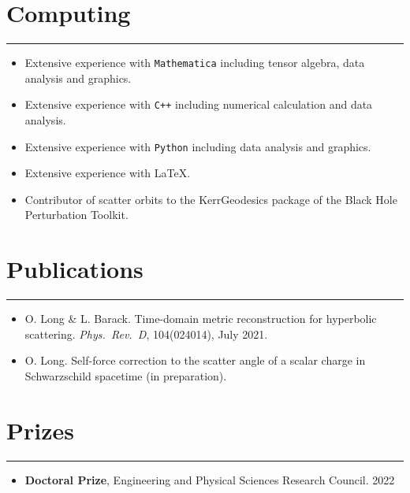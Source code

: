 \documentclass[10.5pt, oneside]{article}   	%
\begin{document}
 {\color{Sectioncolour}
\section*{Computing}
\vspace{-3mm}
\noindent\rule{\linewidth}{0.6pt}}
 \begin{itemize}
\item Extensive experience with \texttt{Mathematica} including tensor algebra, data analysis and graphics. 
\item Extensive experience with \texttt{C++} including numerical calculation and data analysis.
\item Extensive experience with \texttt{Python} including data analysis and graphics. 
\item Extensive experience with \LaTeX.
\item Contributor of scatter orbits to the KerrGeodesics package of the Black Hole Perturbation Toolkit. \href{http://bhptoolkit.org/}{}
\end{itemize}
 

{\color{Sectioncolour}
\section*{Publications}
\vspace{-3mm}
\noindent\rule{\linewidth}{0.6pt}}
\begin{itemize}
\item O. Long \& L. Barack. Time-domain metric reconstruction for hyperbolic scattering. {\it Phys.\ Rev.\ D}, 104(024014), July 2021. \href{https://journals.aps.org/prd/abstract/10.1103/PhysRevD.104.024014}{}
\item O. Long. Self-force correction to the scatter angle of a scalar charge in Schwarzschild spacetime (in preparation).
\end{itemize} 


{\color{Sectioncolour}
\section*{Prizes}
\vspace{-3mm}
\noindent\rule{\linewidth}{0.6pt}}
\begin{itemize}
\item \textbf{Doctoral Prize}, Engineering and Physical Sciences Research Council. \hfill 2022
\end{itemize}
\end{document}

